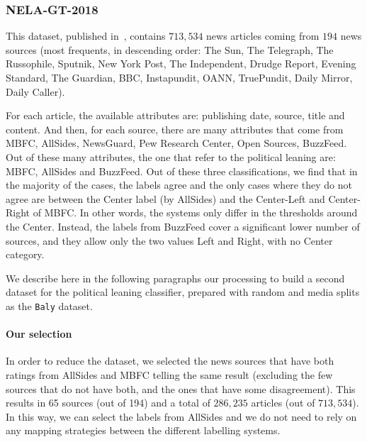 \subsubsection{NELA-GT-2018}

This dataset, published in~\citet{DVN/ULHLCB_2019}, contains $713,534$ news articles coming from $194$ news sources (most frequents, in descending order: The Sun, The Telegraph, The Russophile, Sputnik, New York Post, The Independent, Drudge Report, Evening Standard, The Guardian, BBC, Instapundit, OANN, TruePundit, Daily Mirror, Daily Caller).

For each article, the available attributes are: publishing date, source, title and content.
And then, for each source, there are many attributes that come from MBFC, AllSides, NewsGuard, Pew Research Center, Open Sources, BuzzFeed. Out of these many attributes, the one that refer to the political leaning are: MBFC, AllSides and BuzzFeed. Out of these three classifications, we find that in the majority of the cases, the labels agree and the only cases where they do not agree are between the Center label (by AllSides) and the Center-Left and Center-Right of MBFC. In other words, the systems only differ in the thresholds around the Center.
Instead, the labels from BuzzFeed cover a significant lower number of sources, and they allow only the two values Left and Right, with no Center category.

We describe here in the following paragraphs our processing to build a second dataset for the political leaning classifier, prepared with random and media splits as the \texttt{Baly} dataset.

\paragraph{Our selection}

In order to reduce the dataset, we selected the news sources that have both ratings from AllSides and MBFC telling the same result (excluding the few sources that do not have both, and the ones that have some disagreement).
This results in 65 sources (out of 194) and a total of $286,235$ articles (out of $713,534$).
In this way, we can select the labels from AllSides and we do not need to rely on any mapping strategies between the different labelling systems.

